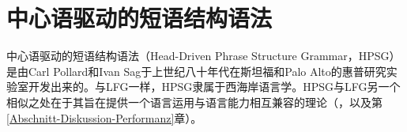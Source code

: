 
\chapter{中心语驱动的短语结构语法}
\label{Kapitel-HPSG}
\label{chap-HPSG}

中心语驱动的短语结构语法（Head-Driven Phrase Structure Grammar，HPSG） 是由Carl Pollard和Ivan Sag于上世纪八十年代在斯坦福和Palo Alto的惠普研究实验室开发出来的\citep{ps,ps2}。与LFG一样，HPSG隶属于西海岸语言学。HPSG与LFG另一个相似之处在于其旨在提供一个语言运用与语言能力相互兼容的理论（\citealp{SW2011a,SW2015a}，以及第\ref{Abschnitt-Diskussion-Performanz}章）。

